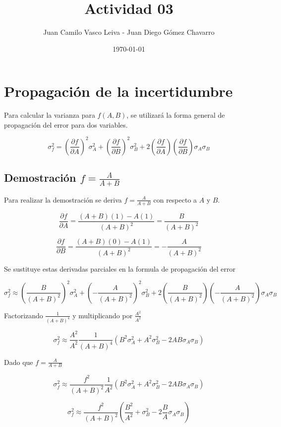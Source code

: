 \documentclass[a4paper,12pt]{article} %
\title{Actividad 03}
\author{Juan Camilo Vasco Leiva - Juan Diego G\'omez Chavarro}
\date{\today} %
\begin{document}
	
	\maketitle  %
	
	\section{Propagaci\'on de la incertidumbre}
	Para calcular la varianza para $f(A, B)$, se utilizar\'a la forma general de propagaci\'on del error para dos variables.
	
	\[
	\sigma_f^2 = \left( \frac{\partial f}{\partial A} \right)^2 \sigma_A^2 + \left( \frac{\partial f}{\partial B} \right)^2 \sigma_B^2 + 2 \left( \frac{\partial f}{\partial A} \right) \left( \frac{\partial f}{\partial B} \right) \sigma_A \sigma_B
	\]
	
		\subsection{Demostraci\'on $f = \frac{A}{A + B}$}
		
		Para realizar la demostraci\'on se deriva $f = \frac{A}{A + B}$ con respecto a $A$ y $B$.
		
		
		\[
		\frac{\partial f}{\partial A} = \frac{(A+B)(1) - A(1)}{(A+B)^2} = \frac{B}{(A+B)^2}
		\]
		
		\[
		\frac{\partial f}{\partial B} = \frac{(A+B)(0) - A(1)}{(A+B)^2} = -\frac{A}{(A+B)^2}
		\]
		
		
		Se sustituye estas derivadas parciales en la formula de propagaci\'on del error
		
		\[
		\sigma_f^2 \approx \left(\frac{B}{(A+B)^2} \right)^2 \sigma_A^2 + \left(-\frac{A}{(A+B)^2} \right)^2 \sigma_B^2 + 2 \left(\frac{B}{(A+B)^2} \right) \left(-\frac{A}{(A+B)^2} \right) \sigma_A \sigma_B
		\]
		
		
		Factorizando $\frac{1}{(A+B)^4}$ y multiplicando por $\frac{A^2}{A^2}$
		
		
		\[
		\sigma_f^2 \approx \frac{A^2}{A^2} \frac{1}{(A+B)^4} \left( B^2 \sigma_A^2 + A^2 \sigma_B^2 - 2 A B \sigma_A \sigma_B \right)
		\]
		
		Dado que $f = \frac{A}{A + B}$
		
		\[
		\sigma_f^2 \approx  \frac{f^2}{(A+B)^2} \frac{1}{A^2} \left( B^2 \sigma_A^2 + A^2 \sigma_B^2 - 2 A B \sigma_A \sigma_B \right)
		\]
		
		\[
		\sigma_f^2 \approx \frac{f^2}{(A+B)^2} \left( \frac{B^2}{A^2}  +  \sigma_B^2 - 2 \frac{B}{A} \sigma_A \sigma_B \right)
		\]
		
\end{document}
